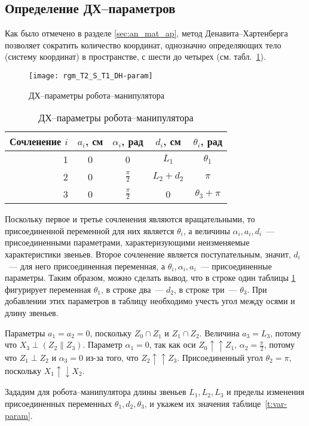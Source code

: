 \documentclass[oneside, final, 14pt]{extarticle}
\begin{document}
\subsection{Определение ДХ--параметров}

Как было отмечено в разделе \ref{sec:an_mat_ap}, метод Денавита--Хартенберга позволяет сократить количество координат, однозначно определяющих тело (систему координат) в пространстве, с шести до четырех (см. табл.~\ref{t:dh-param}).

\begin{figure}[h]
  \centering
  \texttt{[image: rgm\_T2\_S\_T1\_DH-param]}
  \caption{ДХ--параметры робота--манипулятора}
  \label{i:rgm_T2_S_T1_DH-param}
\end{figure}
\par

\begin{table}[t]
\centering
\begin{tabular}{|r|c|c|c|c|}
  \hline Сочленение \(i\) & \(a_i\), см & \(\alpha_i\), рад & \(d_i\), см & \(\theta_i\), рад \\ \hline
  1 & 0 & 0 & \(L_1\) & \(\theta_1\) \\ \hline
  2 & 0 & \(\frac{\pi}{2}\) & \(L_2+ d_2\) & \(\pi\) \\ \hline
  3 & 0  & \(\frac{\pi}{2}\) & 0 & \(\theta_3 + \pi\) \\ \hline
\end{tabular}
\caption{ДХ--параметры робота--манипулятора}
\label{t:dh-param}
\end{table}

Поскольку первое и третье сочленения являются вращательными, то присоединенной переменной для них является \(\theta_i\), а величины \(\alpha_i, a_i, d_i\)~--- присоединенными параметрами, характеризующими неизменяемые характеристики звеньев.
Второе сочленение является поступательным, значит, \(d_i\)~--- для него присоединенная переменная, а \(\theta_i, \alpha_i, a_i\)~--- присоединенные параметры.
Таким образом, можно сделать вывод, что в строке один таблицы \ref{t:dh-param} фигурирует переменная \(\theta_1\), в строке два~--- \(d_2\), в строке три~--- \(\theta_3\). При добавлении этих параметров в таблицу необходимо учесть угол между осями и длину звеньев.
\par
Параметры \(a_1 = a_2 = 0\), поскольку \(Z_0 \cap Z_1\) и \(Z_1 \cap Z_2\).
Величина \(a_3 = L_3\), потому что \(X_3 \perp (Z_2 \| Z_3)\).
Параметр \(\alpha_1 = 0\), так как оси \(Z_0 \uparrow\uparrow Z_1\), \(\alpha_2 = \frac{\pi}{2}\), потому что \(Z_1 \perp Z_2\) и \(\alpha_3 = 0\) из-за того, что \(Z_2 \uparrow \uparrow Z_3\).
Присоединенный угол \(\theta_2 = \pi\), поскольку \(X_1 \uparrow \downarrow X_2\).
\par
Зададим для робота--манипулятора длины звеньев \(L_1, L_2, L_3\) и пределы изменения присоединенных переменных \(\theta_1, d_2, \theta_3\), и укажем их значения таблице~\ref{t:var-param}.
\end{document}
